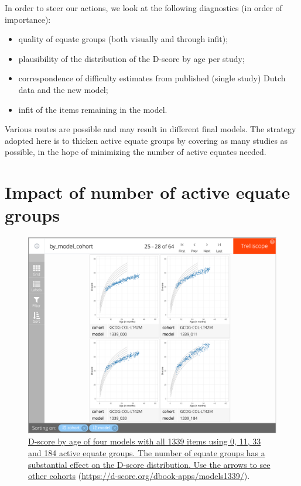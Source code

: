 \documentclass[
]{book}
\providecommand{\tightlist}{%
  \setlength{\itemsep}{0pt}\setlength{\parskip}{0pt}}
\begin{document}
In order to steer our actions, we look at the following diagnostics (in order of importance):

\begin{itemize}
\tightlist
\item
  quality of equate groups (both visually and through infit);
\item
  plausibility of the distribution of the D-score by age per study;
\item
  correspondence of difficulty estimates from published (single study) Dutch data and the new model;
\item
  infit of the items remaining in the model.
\end{itemize}

Various routes are possible and may result in different final models. The strategy adopted here is to thicken active equate groups by covering as many studies as possible, in the hope of minimizing the number of active equates needed.

\hypertarget{sec:impactequate}{%
\section{Impact of number of active equate groups}\label{sec:impactequate}}

\begin{figure}

{\centering \includegraphics[width=1\linewidth]{fig/fig_5.2} 

}

\caption{\href{https://d-score.org/dbook-apps/models1339/\#display=by_model_cohort\&nrow=2\&ncol=2\&arr=row\&pg=7\&labels=cohort,model\&sort=cohort;asc,model;asc\&filter=\&sidebar=\&fv=}{D-score by age of four models with all 1339 items using 0, 11, 33 and 184 active equate groups. The number of equate groups has a substantial effect on the D-score distribution. Use the arrows to see other cohorts} (\url{https://d-score.org/dbook-apps/models1339/}).}\label{fig:model1339}
\end{figure}
\end{document}
